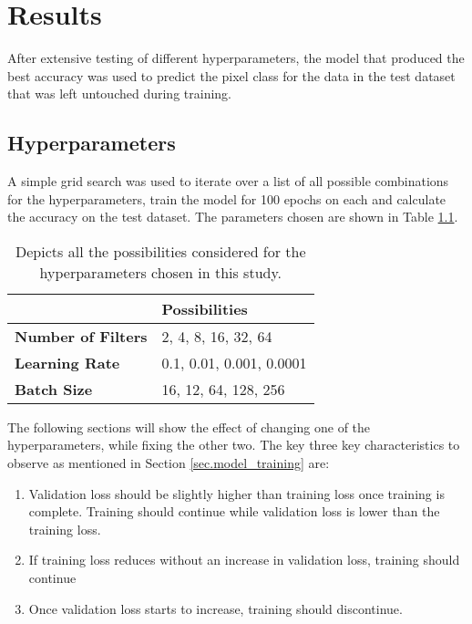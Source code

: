 \chapter{Results}
After extensive testing of different hyperparameters, the model that produced the best accuracy was used to predict the pixel class for the data in the test dataset that was left untouched during training. 
\section{Hyperparameters}
A simple grid search was used to iterate over a list of all possible combinations for the hyperparameters, train the model for 100 epochs on each and calculate the accuracy on the test dataset. The parameters chosen are shown in Table \ref{tab.grid_search}. 
\begin{table}[htbp]
\centering 
\begin{tabular}{l|l}
                           & \textbf{Possibilities}   \\ \hline
\textbf{Number of Filters} & 2, 4, 8, 16, 32, 64      \\ 
\textbf{Learning Rate}     & 0.1, 0.01, 0.001, 0.0001 \\ 
\textbf{Batch Size}        & 16, 12, 64, 128, 256     \\ 
\end{tabular}
\caption[Hyperparameter possibilities]{Depicts all the possibilities considered for the hyperparameters chosen in this study.}
\label{tab.grid_search}
\end{table}
The following sections will show the effect of changing one of the hyperparameters, while fixing the other two. The key three key characteristics to observe as mentioned in Section \ref{sec.model_training} are:
\begin{enumerate}
    \item Validation loss should be slightly higher than training loss once training is complete. Training should continue while validation loss is lower than the training loss.
    \item If training loss reduces without an increase in validation loss, training should continue
    \item Once validation loss starts to increase, training should discontinue. 
\end{enumerate}
